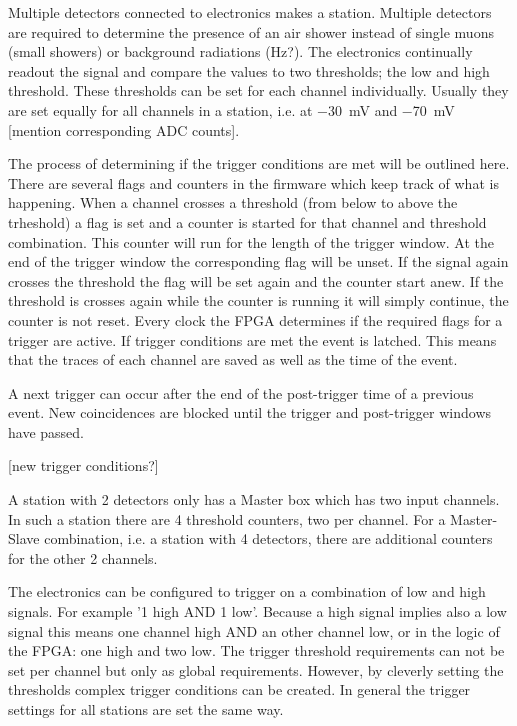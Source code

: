 %


Multiple detectors connected to \hisparc electronics makes a station. Multiple detectors are required to determine the presence of an air shower instead of single muons (small showers) or background radiations (Hz?). The \hisparc electronics continually readout the signal and compare the \adc values to two thresholds; the low and high threshold. These thresholds can be set for each channel individually. Usually they are set equally for all channels in a station, i.e. at \SI{-30}{\milli\volt} and \SI{-70}{\milli\volt} [mention corresponding ADC counts].

The process of determining if the trigger conditions are met will be outlined here. There are several flags and counters in the firmware which keep track of what is happening. When a channel crosses a threshold (from below to above the trheshold) a flag is set and a counter is started for that channel and threshold combination. This counter will run for the length of the trigger window. At the end of the trigger window the corresponding flag will be unset. If the signal again crosses the threshold the flag will be set again and the counter start anew. If the threshold is crosses again while the counter is running it will simply continue, the counter is not reset. Every clock the FPGA determines if the required flags for a trigger are active. If trigger conditions are met the event is latched. This means that the traces of each channel are saved as well as the time of the event.

A next trigger can occur after the end of the post-trigger time of a previous event. New coincidences are blocked until the trigger and post-trigger windows have passed.

[new trigger conditions?]

A station with 2 detectors only has a Master box which has two input channels. In such a station there are 4 threshold counters, two per channel. For a Master-Slave combination, i.e. a station with 4 detectors, there are additional counters for the other 2 channels.

The electronics can be configured to trigger on a combination of low and high signals. For example '1 high AND 1 low'. Because a high signal implies also a low signal this means one channel high AND an other channel low, or in the logic of the FPGA: one high and two low. The trigger threshold requirements can not be set per channel but only as global requirements. However, by cleverly setting the thresholds complex trigger conditions can be created. In general the trigger settings for all stations are set the same way.

